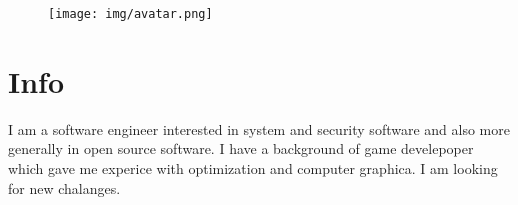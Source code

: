 \documentclass{mycv}
\begin{document}
\begin{paracol}{2}


  \begin{figure}[h!]
    \centering
  \texttt{[image: img/avatar.png]}
\end{figure}

\section{Info}


\vspace{1cm}

\vspace{1mm}
I am a software engineer interested in system and security software and also more generally in open source software. I have a background of game develepoper which gave me experice with optimization and computer graphica. I am looking for new chalanges.


\end{paracol}
\end{document}
